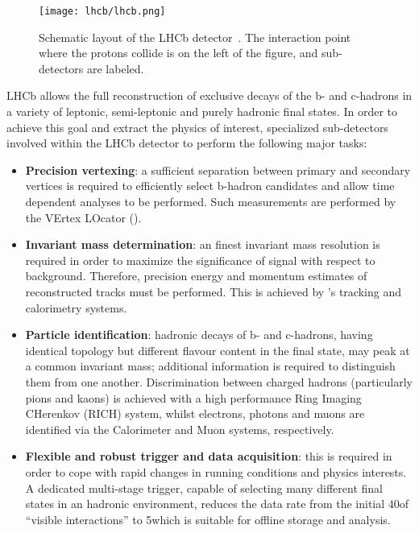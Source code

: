 \begin{figure}[tb]
\begin{center}
\texttt{[image: lhcb/lhcb.png]}
\end{center}
\caption{\small Schematic layout of the LHCb detector~\cite{Alves:2008zz}. 
The interaction point where the protons collide is on the left of the figure, 
and sub-detectors are labeled.}
\label{fig:lhcb}
\end{figure}

LHCb allows the full reconstruction of exclusive decays of the b- and c-hadrons
in a variety of leptonic, semi-leptonic and purely hadronic final states. 
In order to achieve this goal and extract the physics of interest, 
specialized sub-detectors involved within the LHCb detector to perform the 
following major tasks:

\begin{itemize}

\item {\bf Precision vertexing}: a sufficient separation between primary and 
secondary vertices is required to efficiently select b-hadron candidates 
and allow time dependent analyses to be performed. Such measurements are 
performed by the VErtex LOcator (\velo).

\item {\bf Invariant mass determination}: an finest invariant mass
resolution is required in order to maximize the significance of signal with
respect to background. Therefore, precision energy and momentum estimates of
reconstructed tracks must be performed. This is achieved by \lhcb's tracking
and calorimetry systems.

\item {\bf Particle identification}: hadronic decays of b- and c-hadrons, 
having identical topology but different flavour content in the final state, 
may peak at a common invariant mass; additional information is required to 
distinguish them from one another. 
Discrimination between charged hadrons (particularly pions and kaons) is 
achieved with a high performance Ring Imaging CHerenkov (RICH) system, 
whilst electrons, photons and muons are identified via the 
Calorimeter and Muon systems, respectively.

\item {\bf Flexible and robust trigger and data acquisition}: this is required 
in order to cope with rapid changes in running conditions and physics 
interests. A dedicated multi-stage trigger, capable of selecting many different 
final states in an hadronic environment, reduces the data rate from the initial 
40\mhz of ``visible interactions'' to 5\khz which is suitable for 
offline storage and analysis.
\end{itemize}


